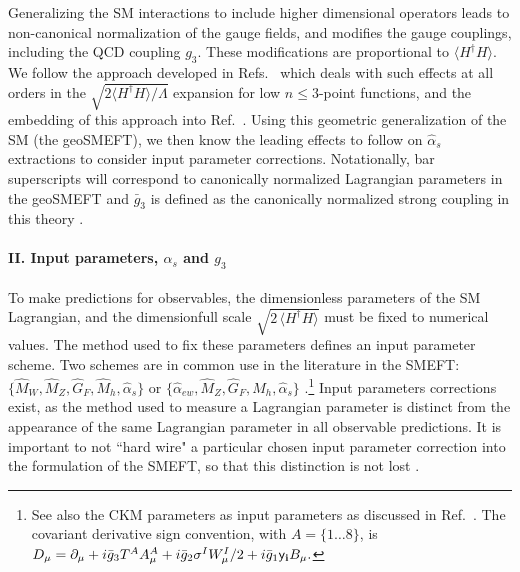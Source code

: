 \documentclass[twocolumn,nofootinbib,amsmath,amssymb,prl,aps,superscriptaddress,tightenlines,preprintnumbers]{revtex4}
\def\hyp{\mathsf{y}}
\begin{document}
Generalizing the SM interactions to include higher dimensional operators leads to non-canonical
normalization of the gauge fields, and modifies the gauge couplings, including the QCD coupling $g_3$.
These modifications are proportional to $\langle H^\dagger H\rangle$.
We follow the approach developed in Refs.~\cite{Helset:2018fgq,Corbett:2019cwl,Helset:2020yio,Hays:2020scx}
which deals with such effects at all orders in the $\sqrt{2 \langle H^\dagger H\rangle/\Lambda}$ expansion
for low $n\leq 3$-point functions, and the embedding of this approach into Ref.~\cite{Murphy:2020rsh}.
Using this geometric generalization of the SM (the geoSMEFT), we then know the leading effects to follow on $\hat{\alpha}_s$ extractions
to consider input parameter corrections. Notationally, bar superscripts will
correspond to canonically normalized Lagrangian parameters in the geoSMEFT
and $\bar{g}_3$ is defined as the canonically normalized strong coupling in this theory
\cite{Helset:2020yio}.

\paragraph{\bf II. Input parameters, $\alpha_s$ and $g_3$}
To make predictions for observables, the dimensionless parameters of the SM Lagrangian, and the dimensionfull scale $\sqrt{2 \, \langle H^\dagger H \rangle}$
must be fixed to numerical values. The method used to fix these parameters defines an input parameter scheme. Two schemes
are in common use in the literature in the SMEFT:
$\{\hat M_W,\hat M_Z,\hat G_F,\hat M_h, \hat \alpha_s \}$ \cite{Brivio:2017bnu,Brivio:2017btx} or  $\{\hat \alpha_{ew},\hat M_Z,\hat G_F,\hat M_h, \hat \alpha_s\}$
\cite{Alonso:2013hga,Falkowski:2014tna,Brivio:2017vri}.\footnote{See also the CKM parameters as input parameters
as discussed in Ref.~\cite{Descotes-Genon:2018foz}. The covariant derivative sign convention, with $A=\{1\dots 8\}$, is
$D_\mu = \partial_\mu + i \bar{g}_3 T^A A^A_\mu + i \bar{g}_2  \sigma^I W^I_\mu/2 + i \bar{g}_1 {\bf \hyp_i} B_\mu.$}
Input parameters corrections exist, as
the method used to measure a Lagrangian parameter is distinct from the appearance
of the same Lagrangian parameter in all observable predictions. It is important to not ``hard wire"
a particular chosen input parameter correction into the formulation of the SMEFT, so that this distinction
is not lost \cite{Brivio:2017bnu,Biekotter:2023xle,Brivio:2021yjb}.
\end{document}
